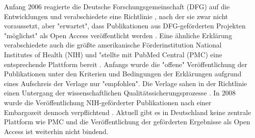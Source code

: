 Anfang 2006 reagierte die Deutsche Forschungsgemeinschaft (DFG) auf die Entwicklungen und verabschiedete eine Richtlinie \cite{DFG_2006}, nach der sie zwar nicht voraussetzt, aber "erwartet", dass Publikationen aus DFG-geförderten Projekten "möglichst" als Open Access veröffentlicht werden \cite{DFG_2014a}. Eine ähnliche Erklärung verabschiedete auch die größte amerikanische Förderinstitution National Institutes of Health (NIH) und "stellte mit PubMed Central (PMC) eine entsprechende Plattform bereit \cite{Mueller_2010}. Anfangs wurde die "offene" Veröffentlichung der Publikationen unter den Kriterien und Bedingungen der Erklärungen aufgrund eines Aufschreis der Verlage nur "empfohlen". Die Verlage sahen in der Richtlinie einen Untergang der wissenschaftlichen Qualitätssicherungsprozesse \cite{Baggs_2006}. In 2008 wurde die Veröffentlichung NIH-geförderter Publikationen nach einer Embargozeit dennoch verpflichtend \cite{Hanekop_2014}. Aktuell gibt es in Deutschland keine zentrale Plattform wie PMC und die Veröffentlichung der geförderten Ergebnisse als Open Access ist weiterhin nicht bindend.

